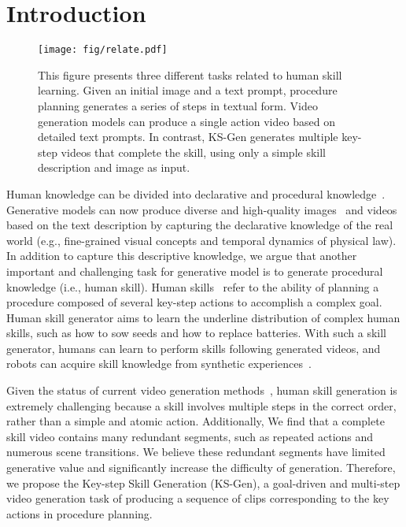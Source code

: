 \section{Introduction}
\label{sec:intro}

\begin{figure}[t]
  \centering
   \texttt{[image: fig/relate.pdf]}
   \caption{This figure presents three different tasks related to human skill learning. Given an initial image and a text prompt, procedure planning generates a series of steps in textual form. Video generation models can produce a single action video based on detailed text prompts. In contrast, KS-Gen generates multiple key-step videos that complete the skill, using only a simple skill description and image as input.}
   \label{fig:intro}
\end{figure}

Human knowledge can be divided into declarative and procedural knowledge~\cite{Knowledge}. Generative models can now produce diverse and high-quality images~\cite{dalle2,sd} and videos~\cite{SVD,aa,AnimateDiff,latte,dynamicrafter,cogvideox} based on the text description by capturing the declarative knowledge of the real world (e.g., fine-grained visual concepts and temporal dynamics of physical law). 
In addition to capture this descriptive knowledge, we argue that another important and challenging task for generative model is to generate procedural knowledge (i.e., human skill). Human skills~\cite{howto100m,COIN,Survery21} refer to the ability of planning a procedure composed of several key-step actions to accomplish a complex goal. Human skill generator aims to learn the underline distribution of complex human skills, such as how to sow seeds and how to replace batteries. With such a skill generator, humans can learn to perform skills following generated videos, and robots can acquire skill knowledge from synthetic experiences~\cite{gen2act}. 

Given the status of current video generation methods~\cite{SVD,aa,AnimateDiff,latte,dynamicrafter,cogvideox}, human skill generation is extremely challenging because a skill involves multiple steps in the correct order, rather than a simple and atomic action. Additionally, We find that a complete skill video contains many redundant segments, such as repeated actions and numerous scene transitions. We believe these redundant segments have limited generative value and significantly increase the difficulty of generation. Therefore, we propose the Key-step Skill Generation (KS-Gen), a goal-driven and multi-step video generation task of producing a sequence of clips corresponding to the key actions in procedure planning. 


